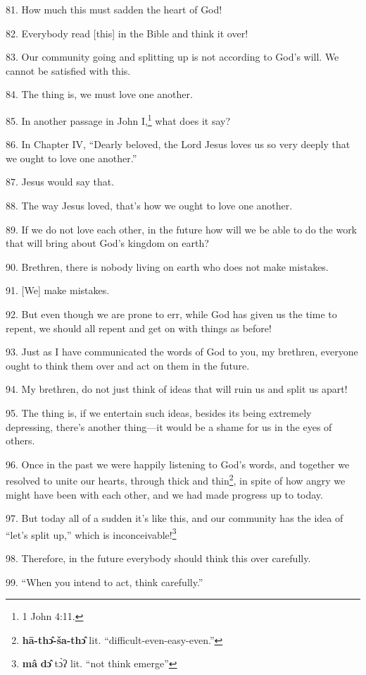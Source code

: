 81. How much this must sadden the heart of God!

82. Everybody read [this] in the Bible and think it over!

83. Our community going and splitting up is not according to God's will. We cannot
be satisfied with this.

84. The thing is, we must love one another.

85. In another passage in John I,\footnote{1 John 4:11.} what does it say?

86. In Chapter IV, ``Dearly beloved, the Lord Jesus loves us so very deeply that
we ought to love one another.''

87. Jesus would say that.

88. The way Jesus loved, that's how we ought to love one another.

89. If we do not love each other, in the future how will we be able to do the work
that will bring about God's kingdom on earth?

90. Brethren, there is nobody living on earth who does not make mistakes.

91. [We] make mistakes.

92. But even though we are prone to err, while God has given us the time to repent,
we should all repent and get on with things as before!

93. Just as I have communicated the words of God to you, my brethren, everyone
ought to think them over and act on them in the future.

94. My brethren, do not just think of ideas that will ruin us and split us apart!

95. The thing is, if we entertain such ideas, besides its being extremely depressing,
there's another thing---it would be a shame for us in the eyes of others.

96. Once in the past we were happily listening to God's words, and together we
resolved to unite our hearts, through thick and thin\footnote{\textbf{hā-thɔ̂-ša-thɔ̂} lit. ``difficult-even-easy-even.''}, in spite of how angry
we might have been with each other, and we had made progress up to today.

97. But today all of a sudden it's like this, and our community has the idea of
``let's split up,'' which is inconceivable!\footnote{\textbf{mâ} \textbf{dɔ̂} tɔ̀ʔ lit. ``not think emerge''}

98. Therefore, in the future everybody should think this over carefully.

99. ``When you intend to act, think carefully.''

